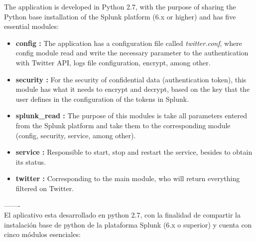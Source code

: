 \documentclass[report]{article}
\begin{document}
The application is developed in Python 2.7, with the purpose of sharing the Python base installation of the Splunk platform (6.x or higher) and has five essential modules:
\newline
\begin{itemize}
\item {\bf config :} The application has a configuration file called \textit{twitter.conf}, where config module read and write the necessary parameter to the authentication with Twitter API, logs file configuration, encrypt, among other.

\item {\bf security :} For the security of confidential data (authentication token), this module has what it needs to encrypt and decrypt, based on the key that the user defines in the configuration of the tokens in Splunk.

\item {\bf splunk\_read :} The purpose of this modules is take all parameters entered from the Splunk platform and take them to the corresponding module (config, security, service, among other).

\item {\bf service :} Responsible to start, stop and restart the service, besides to obtain its status.

\item {\bf twitter :} Corresponding to the main module, who will return everything filtered on Twitter.
\newline
\end{itemize}
-------\\
El aplicativo esta desarrollado en python 2.7, con la finalidad de compartir la instalación base de python de la plataforma Splunk (6.x o superior) y cuenta con cinco m\'odulos esenciales:
\newline
\end{document}
